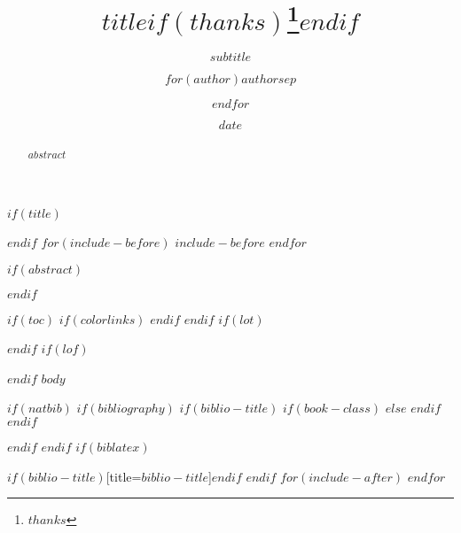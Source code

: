 \documentclass[$if(fontsize)$$fontsize$,$endif$$if(lang)$$babel-lang$,$endif$$if(papersize)$$papersize$paper,$endif$$for(classoption)$$classoption$$sep$,$endfor$]{$documentclass$}
\title{$title$$if(thanks)$\thanks{$thanks$}$endif$}
\subtitle{$subtitle$}
\author{$for(author)$$author$$sep$ \and $endfor$}
\institute{$for(institute)$$institute$$sep$ \and $endfor$}
\date{$date$}
\begin{document}
    $if(title)$
    \maketitle
    $endif$
    $for(include-before)$
    $include-before$
    $endfor$

    $if(abstract)$
    \begin{abstract}
        $abstract$
    \end{abstract}
    $endif$

    $if(toc)$
    {
    $if(colorlinks)$
    \hypersetup{linkcolor=$if(toccolor)$$toccolor$$else$black$endif$}
    $endif$
    \setcounter{tocdepth}{$toc-depth$}
    \tableofcontents
    \thispagestyle{empty}
    }
    $endif$
    $if(lot)$
    \listoftables
    $endif$
    $if(lof)$
    \listoffigures
    $endif$
    \clearpage
    \lhead{}
    \chead{}
    \rhead{}
    \lfoot{}
    \cfoot{\thepage}
    \rfoot{}
    $body$

    $if(natbib)$
    $if(bibliography)$
    $if(biblio-title)$
    $if(book-class)$
    \renewcommand\bibname{$biblio-title$}
    $else$
    \renewcommand\refname{$biblio-title$}
    $endif$
    $endif$
    
    \pagebreak

    $endif$
    $endif$
    $if(biblatex)$
    
    \printbibliography$if(biblio-title)$[title=$biblio-title$]$endif$
    $endif$
    \pagebreak
    $for(include-after)$
    $endfor$
\end{document}

